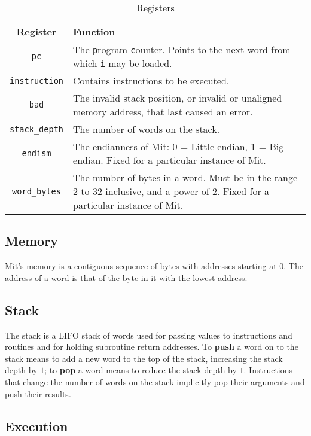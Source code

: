 \documentclass[a4paper]{article}
\begin{document}
\begin{table}[htbp]
\begin{center}
\begin{tabular}{cp{3.75in}} \toprule
\bf Register & \bf Function \\
 \midrule
{\tt pc} & The {\tt p}rogram {\tt c}ounter. Points to the next word from which {\tt i} may be loaded. \\
{\tt instruction} & Contains instructions to be executed. \\
{\tt bad} & The invalid stack position, or invalid or unaligned memory address, that last caused an error. \\
{\tt stack\_depth} & The number of words on the stack. \\
{\tt endism} & The endianness of Mit: 0 = Little-endian, 1 = Big-endian. Fixed for a particular instance of Mit. \\
{\tt word\_bytes} & The number of bytes in a word. Must be in the range $2$ to $32$ inclusive, and a power of $2$. Fixed for a particular instance of Mit. \\
 \bottomrule
\end{tabular}
\caption{\label{regtable}Registers}
\end{center}
\end{table}


\subsection{Memory}

Mit's memory is a contiguous sequence of bytes with addresses
starting at $0$. The address of a word is that of the byte in it with the
lowest address.


\subsection{Stack}

The stack is a LIFO stack of words used for passing values to instructions and routines and for holding subroutine return addresses. To {\bf push} a word on to the stack means to add a new word to the top of the stack, increasing the stack depth by $1$; to {\bf pop} a word means to reduce the stack depth by $1$. Instructions that change the number of words on the stack implicitly pop their arguments and push their results.


\subsection{Execution}
\label{execution}
\end{document}
